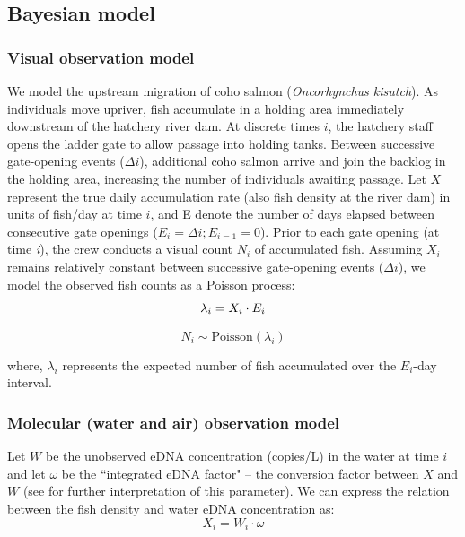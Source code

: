 \documentclass{article}
\begin{document}
\subsection{Bayesian model}
\subsubsection{Visual observation model}
We model the upstream migration of coho salmon (\textit{Oncorhynchus kisutch}). As individuals move upriver, fish accumulate in a holding area immediately downstream of the hatchery river dam. At discrete times $i$, the hatchery staff opens the ladder gate to allow passage into holding tanks. Between successive gate-opening events ($\Delta i$), additional coho salmon arrive and join the backlog in the holding area, increasing the number of individuals awaiting passage. Let $X$ represent the true daily accumulation rate (also fish density at the river dam) in units of fish/day at time $i$, and E denote the number of days elapsed between consecutive gate openings ($ E_i =\Delta i; E_{i=1} = 0$). Prior to each gate opening (at time \textit{i}), the crew conducts a visual count $N_i$ of accumulated fish.
Assuming $X_i$ remains relatively constant between successive gate-opening events ($\Delta i$), we model the observed fish counts as a Poisson process:
\begin{equation}
\lambda_i = X_i \cdot E_i \\
\end{equation}

\begin{equation}
N_i \sim \mathrm{Poisson}(\lambda_i)
\end{equation}

where, $\lambda_i$ represents the expected number of fish accumulated over the $E_i$-day interval.

\subsubsection{Molecular (water and air) observation model}
Let $W$ be the unobserved eDNA concentration (copies/L) in the water at time $i$ and let $\omega$ be the ``integrated eDNA factor" -- the conversion factor between $X$ and $W$ (see \cite{guri2024a} for further interpretation of this parameter). We can express the relation between the fish density and water eDNA concentration as:
\begin{equation}
X_{i} = W_{i} \cdot \omega
\end{equation}
\end{document}
